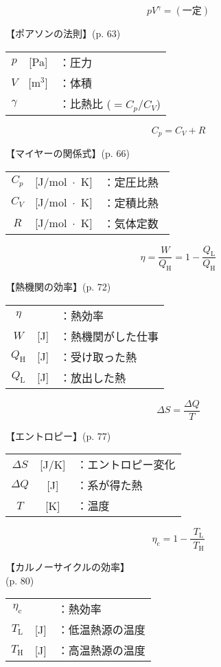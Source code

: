 \documentclass[10pt]{jarticle}
\begin{document}
\newpage
\[
	pV^\gamma = (一定)
\]


\vskip3mm
【ポアソンの法則】{\footnotesize (p. 63)}

\begin{tabular}{ccl}
$p$	&[Pa]	&：圧力\\
$V$	&[m$^3$]	&：体積\\
$\gamma$	&	&：比熱比 ($= C_p / C_V$)
\end{tabular}




\newpage
\[
	C_p = C_V + R
\]


\vskip3mm
【マイヤーの関係式】{\footnotesize (p. 66)}

\begin{tabular}{ccl}
$C_p$	&[J/mol $\!\! \cdot \!\! $ K]	&：定圧比熱\\
$C_V$	&[J/mol $\!\! \cdot \!\! $ K]	&：定積比熱\\
$R$	&[J/mol $\!\! \cdot \!\! $ K]	&：気体定数\
\end{tabular}




\newpage
\[
	\eta = \frac{W}{Q_\mathrm{H}} = 1- \frac{Q_\mathrm{L}}{Q_\mathrm{H}}
\]


\vskip3mm
【熱機関の効率】{\footnotesize (p. 72)}

\begin{tabular}{ccl}
$\eta$	&	&：熱効率\\
$W$	&[J]	&：熱機関がした仕事\\
$Q_\mathrm{H}$	&[J]	&：受け取った熱\\
$Q_\mathrm{L}$	&[J]	&：放出した熱
\end{tabular}



\newpage
\[
	\mathit{\Delta} S = \frac{\mathit{\Delta} Q}{T}
\]


\vskip3mm
【エントロピー】{\footnotesize (p. 77)}

\begin{tabular}{ccl}
$\mathit{\Delta} S$	&[J/K]	&：エントロピー変化\\
$\mathit{\Delta} Q$	&[J]	&：系が得た熱\\
$T$	&[K]	&：温度
\end{tabular}




\newpage
\[
	\eta_\mathrm{c} =  1- \frac{\; T_\mathrm{L}}{\; T_\mathrm{H}}
\]


\vskip3mm
【カルノーサイクルの効率】\\
\hfill {\footnotesize (p. 80)}

\begin{tabular}{ccl}
$\eta_\mathrm{c}$	&	&：熱効率\\
$T_\mathrm{L}$	&[J]	&：低温熱源の温度\\
$T_\mathrm{H}$	&[J]	&：高温熱源の温度
\end{tabular}
\end{document}

